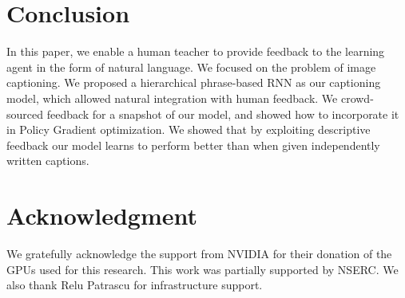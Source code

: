 
\vspace{-3mm}
\section{Conclusion}
\label{sec:conc}
\vspace{-2mm}

In this paper, we enable a human teacher to provide feedback to the learning agent in the form of natural language. We focused on the problem of image captioning. 
We proposed a hierarchical phrase-based RNN as our captioning model, which allowed natural integration with human feedback. We crowd-sourced feedback for a snapshot of our model, and showed how to incorporate it in Policy Gradient optimization. We showed  that by exploiting descriptive feedback our model learns to perform better than when given independently written captions. %


\vspace{-3mm}
\section*{Acknowledgment}
\vspace{-3mm}
\begin{small}
We gratefully acknowledge the support from NVIDIA for their donation of the GPUs used for this research. This work was partially  supported by NSERC. We also thank Relu Patrascu for infrastructure support. \end{small}

